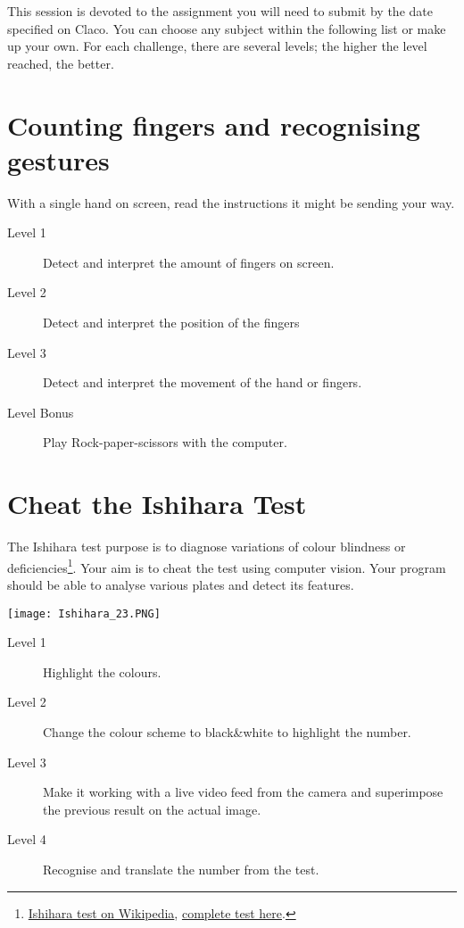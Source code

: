 \documentclass{labo}
\author{}
\begin{document}

This session is devoted to the assignment you will need to submit by the date specified on Claco.
You can choose any subject within the following list or make up your own.
For each challenge, there are several levels; the higher the level reached, the better.


\section*{Counting fingers and recognising gestures}
With a single hand on screen, read the instructions it might be sending your way.

\begin{description}
	\item[Level 1] Detect and interpret the amount of fingers on screen.
	\item[Level 2] Detect and interpret the position of the fingers \faHandPeaceO \faHandSpockO \faHandScissorsO
	\item[Level 3] Detect and interpret the movement of the hand or fingers.
	\item[Level Bonus] Play Rock-paper-scissors with the computer.
\end{description}


\section*{Cheat the Ishihara Test}
The Ishihara test purpose is to diagnose variations of colour blindness or deficiencies\footnote{\href{https://en.wikipedia.org/wiki/Ishihara\_test}{Ishihara test on Wikipedia}, \href{http://daltonien.free.fr/daltonien/article.php3?id_article=6}{complete test here}.}.
Your aim is to cheat the test using computer vision. Your program should be able to analyse various plates and detect its features.

\begin{center}
\texttt{[image: Ishihara\_23.PNG]}
\end{center}

\begin{description}
	\item[Level 1] Highlight the colours.
	\item[Level 2] Change the colour scheme to black\&white to highlight the number.
	\item[Level 3] Make it working with a live video feed from the camera and superimpose the previous result on the actual image.
	\item[Level 4] Recognise and translate the number from the test.
\end{description}
\end{document}
